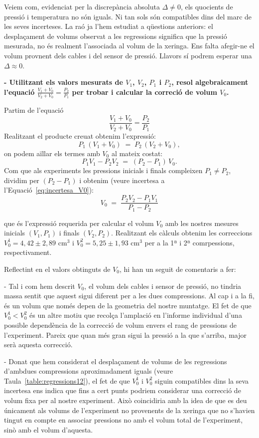 \documentclass[a4paper,twoside,12pt]{article}
\theoremstyle{definition}
\begin{document}
	Veiem com, evidenciat per la discrepància absoluta $\Delta \neq 0$, els quocients de pressió i temperatura no són iguals. Ni tan sols són compatibles dins del marc de les seves incerteses. La raó ja l'hem estudiat a qüestions anteriors: el desplaçament de volums observat a les regressions significa que la pressió mesurada, no és realment l'associada al volum de la xeringa. Ens falta afegir-ne el volum provnent dels cables i del sensor de pressió. Llavors sí podrem esperar una $\Delta \approx 0$.
	
	\textbf{- Utilitzant els valors mesurats de $V_1$, $V_2$, $P_1$ i $P_2$, resol algebraicament l'equació $\frac{V_{1}+V_{0}}{V_{2}+V_{0}}=\frac{P_{2}}{P_{1}}$ per trobar i calcular
		la correció de volum $V_0$.}
	
	Partim de l'equació
	\[
	\frac{V_{1}+V_{0}}{V_{2}+V_{0}}=\frac{P_{2}}{P_{1}}
	\]
	Realitzant el producte creuat obtenim l'expressió:
	\[
	P_{1}\,(V_{1}+V_{0}) \;=\; P_{2}\,(V_{2}+V_{0}),
	\]
	on podem aïllar els termes amb $V_{0}$ al mateix costat:
	\[
	P_{1}V_{1}-P_{2}V_{2} \;=\; (P_{2}-P_{1})\,V_{0}.
	\]
	Com que als experiments les pressions inicials i finals compleixen $P_{1}\neq P_{2}$, dividim per $(P_{2}-P_{1})$ i obtenim (veure incertesa a l'Equació~\ref{eq:incertesa_V0}):
	\begin{equation}
		\label{eq:correction}
		V_{0} \;=\; \frac{P_{2}V_{2}-P_{1}V_{1}}{\,P_{1}-P_{2}\,}
	\end{equation}

	
	que és l’expressió requerida per calcular el volum $V_{0}$ amb les nostres mesures inicials $(V_{1},P_{1})$ i finals $(V_{2},P_{2})$. Realitzant els càlculs obtenim les correccions $V^{1}_0 = 4,42 \pm 2,89$ cm$^3$ i $V^2_0 = 5,25 \pm 1,93$ cm$^3$ per a la 1ª i 2ª comrpessions, respectivament.
	
	Reflectint en el valors obtinguts de $V_0$, hi han un seguit de comentaris a fer:
	
	- Tal i com hem descrit $V_0$, el volum dels cables i sensor de pressió, no tindria massa sentit que aquest sigui diferent per a les dues compressions. Al cap i a la fi, és un volum que només depen de la geometria del nostre muntatge. El fet de que $V^1_0 < V^2_0$ és un altre motiu que recolça l'amplació en l'informe individual d'una possible dependència de la correcció de volum envers el rang de pressions de l'experiment. Pareix que quan més gran sigui la pressió a la que s'arriba, major serà aquesta correcció. 
	

	
	- Donat que hem considerat el desplaçament de volums de les regressions d'ambdues compressions aproximadament iguals (veure Taula~\ref{table:regressions12}), el fet de que $V^1_0$ i $ V^2_0$ siguin compatibles dins la seva incertesa ens indica que fins a cert punts podriem considerar una correcció de volum fixa per al nostre experiment. Això coincidiria amb la idea de que es deu únicament als volums de l'experiment no provenents de la xeringa que no s'havien tingut en compte en associar pressions no amb el volum total de l'experiment, sinò amb el volum d'aquesta.
	
\end{document}

